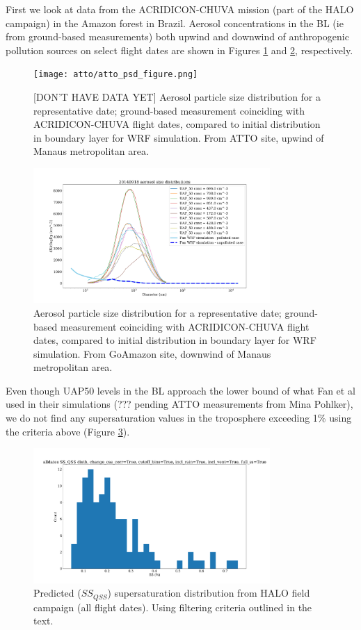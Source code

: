 \documentclass{article}
\begin{document}
First we look at data from the ACRIDICON-CHUVA mission (part of the HALO campaign) in the Amazon forest in Brazil. Aerosol concentrations in the BL (ie from ground-based measurements) both upwind and downwind of anthropogenic pollution sources on select flight dates are shown in Figures \ref{attoasd} and \ref{goaasd}, respectively.

\clearpage
\newpage

\begin{figure}[ht]
    \centering
    \texttt{[image: atto/atto\_psd\_figure.png]}
    \caption{[DON'T HAVE DATA YET] Aerosol particle size distribution for a representative date; ground-based measurement coinciding with ACRIDICON-CHUVA flight dates, compared to initial distribution in boundary layer for WRF simulation. From ATTO site, upwind of Manaus metropolitan area.}
    \label{attoasd}
\end{figure}
\begin{figure}[ht]
    \centering
    \includegraphics[width=9cm]{goama/v5_aero_size_distb_20140918_figure.png}
    \caption{Aerosol particle size distribution for a representative date; ground-based measurement coinciding with ACRIDICON-CHUVA flight dates, compared to initial distribution in boundary layer for WRF simulation. From GoAmazon site, downwind of Manaus metropolitan area.}
    \label{goaasd}
\end{figure}

Even though UAP50 levels in the BL approach the lower bound of what Fan et al used in their simulations (??? pending ATTO measurements from Mina Pohlker), we do not find any supersaturation values in the troposphere exceeding 1\% using the criteria above (Figure \ref{haloqsshist}).

\clearpage
\newpage

\begin{figure}[ht]
    \centering
    \includegraphics[width=9cm]{revhalo/v24_ss_qss_hist_cas_alldates_figure.png}
    \caption{Predicted ($SS_{QSS}$) supersaturation distribution from HALO field campaign (all flight dates). Using filtering criteria outlined in the text.}
    \label{haloqsshist}
\end{figure}
\end{document}
